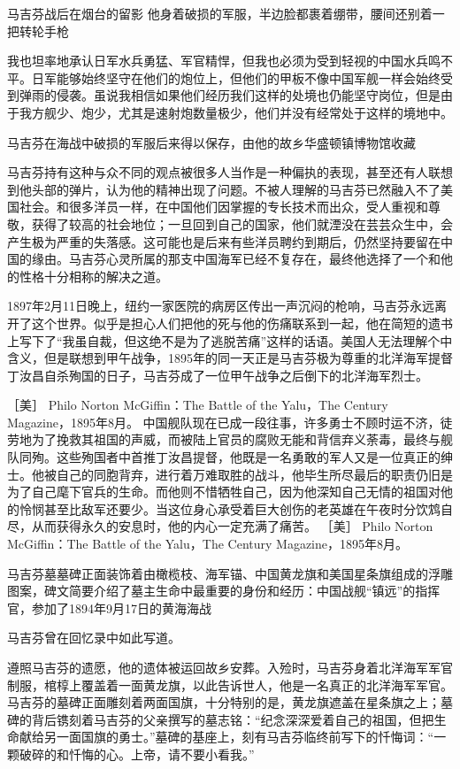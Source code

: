 \documentclass[12pt,UTF8]{ctexbook}
\begin{document}
马吉芬战后在烟台的留影 他身着破损的军服，半边脸都裹着绷带，腰间还别着一把转轮手枪

我也坦率地承认日军水兵勇猛、军官精悍，但我也必须为受到轻视的中国水兵鸣不平。日军能够始终坚守在他们的炮位上，但他们的甲板不像中国军舰一样会始终受到弹雨的侵袭。虽说我相信如果他们经历我们这样的处境也仍能坚守岗位，但是由于我方舰少、炮少，尤其是速射炮数量极少，他们并没有经常处于这样的境地中。


马吉芬在海战中破损的军服后来得以保存，由他的故乡华盛顿镇博物馆收藏

马吉芬持有这种与众不同的观点被很多人当作是一种偏执的表现，甚至还有人联想到他头部的弹片，认为他的精神出现了问题。不被人理解的马吉芬已然融入不了美国社会。和很多洋员一样，在中国他们因掌握的专长技术而出众，受人重视和尊敬，获得了较高的社会地位；一旦回到自己的国家，他们就湮没在芸芸众生中，会产生极为严重的失落感。这可能也是后来有些洋员聘约到期后，仍然坚持要留在中国的缘由。马吉芬心灵所属的那支中国海军已经不复存在，最终他选择了一个和他的性格十分相称的解决之道。

1897年2月11日晚上，纽约一家医院的病房区传出一声沉闷的枪响，马吉芬永远离开了这个世界。似乎是担心人们把他的死与他的伤痛联系到一起，他在简短的遗书上写下了“我虽自裁，但这绝不是为了逃脱苦痛”这样的话语。美国人无法理解个中含义，但是联想到甲午战争，1895年的同一天正是马吉芬极为尊重的北洋海军提督丁汝昌自杀殉国的日子，马吉芬成了一位甲午战争之后倒下的北洋海军烈士。

［美］ Philo Norton McGiffin：The Battle of the Yalu，The Century Magazine，1895年8月。
中国舰队现在已成一段往事，许多勇士不顾时运不济，徒劳地为了挽救其祖国的声威，而被陆上官员的腐败无能和背信弃义荼毒，最终与舰队同殉。这些殉国者中首推丁汝昌提督，他既是一名勇敢的军人又是一位真正的绅士。他被自己的同胞背弃，进行着万难取胜的战斗，他毕生所尽最后的职责仍旧是为了自己麾下官兵的生命。而他则不惜牺牲自己，因为他深知自己无情的祖国对他的怜悯甚至比敌军还要少。当这位身心承受着巨大创伤的老英雄在午夜时分饮鸩自尽，从而获得永久的安息时，他的内心一定充满了痛苦。 ［美］ Philo Norton McGiffin：The Battle of the Yalu，The Century Magazine，1895年8月。


马吉芬墓墓碑正面装饰着由橄榄枝、海军锚、中国黄龙旗和美国星条旗组成的浮雕图案，碑文简要介绍了墓主生命中最重要的身份和经历：中国战舰“镇远”的指挥官，参加了1894年9月17日的黄海海战

马吉芬曾在回忆录中如此写道。

遵照马吉芬的遗愿，他的遗体被运回故乡安葬。入殓时，马吉芬身着北洋海军军官制服，棺椁上覆盖着一面黄龙旗，以此告诉世人，他是一名真正的北洋海军军官。马吉芬的墓碑正面雕刻着两面国旗，十分特别的是，黄龙旗遮盖在星条旗之上；墓碑的背后镌刻着马吉芬的父亲撰写的墓志铭：“纪念深深爱着自己的祖国，但把生命献给另一面国旗的勇士。”墓碑的基座上，刻有马吉芬临终前写下的忏悔词：“一颗破碎的和忏悔的心。上帝，请不要小看我。”
\end{document}
